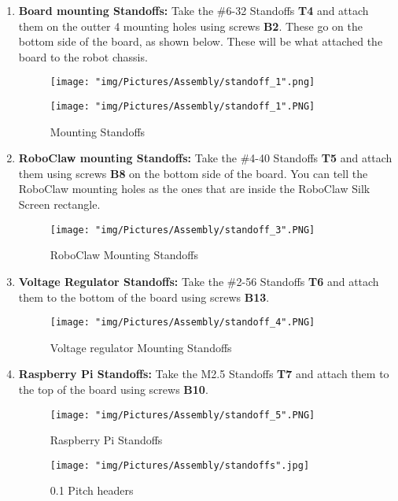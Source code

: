 \documentclass[12pt]{article}
\begin{document}
\begin{enumerate}
\item \textbf{Board mounting Standoffs:} Take the \#6-32 Standoffs \textbf{T4} and attach them on the outter 4 mounting holes using screws \textbf{B2}. These go on the bottom side of the board, as shown below. These will be what attached the board to the robot chassis.

\begin{figure}[H]
  \centering
  \begin{minipage}[b]{0.45\textwidth}
    \texttt{[image: "img/Pictures/Assembly/standoff\_1".png]}
  \end{minipage}
  \hfill
  \begin{minipage}[b]{0.45\textwidth}
    \texttt{[image: "img/Pictures/Assembly/standoff\_1".PNG]}
  \end{minipage}
  \caption{Mounting Standoffs}
  \label{standoffs_1}
\end{figure}

\item \textbf{RoboClaw mounting Standoffs:} Take the \#4-40 Standoffs \textbf{T5} and attach them using screws \textbf{B8} on the bottom side of the board. You can tell the RoboClaw mounting holes as the ones that are inside the RoboClaw Silk Screen rectangle.


\begin{figure}[H]
	\centering
	\texttt{[image: "img/Pictures/Assembly/standoff\_3".PNG]}
	\caption{RoboClaw Mounting Standoffs}
\end{figure}

\item \textbf{Voltage Regulator Standoffs:} Take the \#2-56 Standoffs \textbf{T6} and attach them to the bottom of the board using screws \textbf{B13}. 

\begin{figure}[H]
	\centering
	\texttt{[image: "img/Pictures/Assembly/standoff\_4".PNG]}
	\caption{Voltage regulator Mounting Standoffs}
\end{figure}

\item \textbf{Raspberry Pi  Standoffs:} Take the M2.5 Standoffs \textbf{T7} and attach them to the top of the board using screws \textbf{B10}. 

\begin{figure}[H]
	\centering
	\texttt{[image: "img/Pictures/Assembly/standoff\_5".PNG]}
	\caption{Raspberry Pi Standoffs}
\end{figure}

\begin{figure}[H]
	\centering
	\texttt{[image: "img/Pictures/Assembly/standoffs".jpg]}
	\caption{0.1 Pitch headers}
\end{figure}


\end{enumerate}
\end{document}
